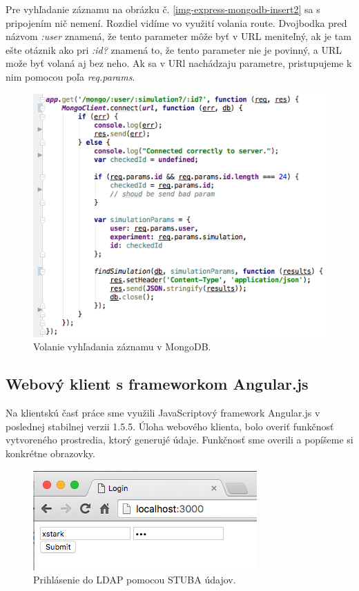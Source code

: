 Pre vyhľadanie záznamu na obrázku č. \ref{img-express-mongodb-insert2} sa s pripojením nič nemení. Rozdiel vidíme vo využití volania route. Dvojbodka pred názvom \textit{:user} znamená, že tento parameter môže byť v URL meniteľný, ak je tam ešte otáznik ako pri \textit{:id?} znamená to, že tento parameter nie je povinný, a URL može byť volaná aj bez neho. Ak sa v URl nachádzaju parametre, pristupujeme k nim pomocou poľa \textit{req.params}.

\begin{figure}[H]
  \centering
  \includegraphics[scale=0.7]{img/code/express-mongodb-find2.png}
  \caption{Volanie vyhľadania záznamu v MongoDB.}
  \label{img-express-mongodb-find}
\end{figure}
 
\subsection{Webový klient s frameworkom Angular.js}\label{section-angular-web}
Na klientskú časť práce sme využili JavaScriptový framework Angular.js v poslednej stabilnej verzii 1.5.5. Úloha webového klienta, bolo overiť funkčnosť vytvoreného prostredia, ktorý generujé údaje. Funkčnosť sme overili a popíšeme si konkrétne obrazovky.

\begin{figure}[H]
  \centering
  \includegraphics[scale=0.7]{img/code/angular-login.png}
  \caption{Prihlásenie do LDAP pomocou STUBA údajov.}
  \label{img-angular-login}
\end{figure}

